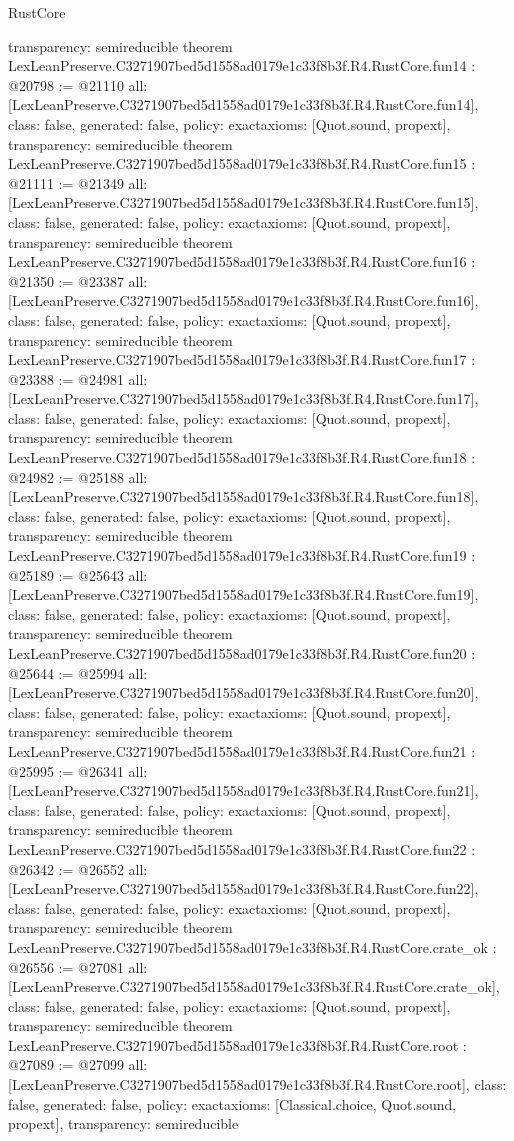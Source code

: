 \begin{lexlean}{RustCore}
\begin{coremodule}
{  transparency: semireducible
}
theorem LexLeanPreserve.C3271907bed5d1558ad0179e1c33f8b3f.R4.RustCore.fun14 : @20798 := @21110 {
  all: [LexLeanPreserve.C3271907bed5d1558ad0179e1c33f8b3f.R4.RustCore.fun14],
  class: false,
  generated: false,
  policy: exact{axioms: [Quot.sound, propext]},
  transparency: semireducible
}
theorem LexLeanPreserve.C3271907bed5d1558ad0179e1c33f8b3f.R4.RustCore.fun15 : @21111 := @21349 {
  all: [LexLeanPreserve.C3271907bed5d1558ad0179e1c33f8b3f.R4.RustCore.fun15],
  class: false,
  generated: false,
  policy: exact{axioms: [Quot.sound, propext]},
  transparency: semireducible
}
theorem LexLeanPreserve.C3271907bed5d1558ad0179e1c33f8b3f.R4.RustCore.fun16 : @21350 := @23387 {
  all: [LexLeanPreserve.C3271907bed5d1558ad0179e1c33f8b3f.R4.RustCore.fun16],
  class: false,
  generated: false,
  policy: exact{axioms: [Quot.sound, propext]},
  transparency: semireducible
}
theorem LexLeanPreserve.C3271907bed5d1558ad0179e1c33f8b3f.R4.RustCore.fun17 : @23388 := @24981 {
  all: [LexLeanPreserve.C3271907bed5d1558ad0179e1c33f8b3f.R4.RustCore.fun17],
  class: false,
  generated: false,
  policy: exact{axioms: [Quot.sound, propext]},
  transparency: semireducible
}
theorem LexLeanPreserve.C3271907bed5d1558ad0179e1c33f8b3f.R4.RustCore.fun18 : @24982 := @25188 {
  all: [LexLeanPreserve.C3271907bed5d1558ad0179e1c33f8b3f.R4.RustCore.fun18],
  class: false,
  generated: false,
  policy: exact{axioms: [Quot.sound, propext]},
  transparency: semireducible
}
theorem LexLeanPreserve.C3271907bed5d1558ad0179e1c33f8b3f.R4.RustCore.fun19 : @25189 := @25643 {
  all: [LexLeanPreserve.C3271907bed5d1558ad0179e1c33f8b3f.R4.RustCore.fun19],
  class: false,
  generated: false,
  policy: exact{axioms: [Quot.sound, propext]},
  transparency: semireducible
}
theorem LexLeanPreserve.C3271907bed5d1558ad0179e1c33f8b3f.R4.RustCore.fun20 : @25644 := @25994 {
  all: [LexLeanPreserve.C3271907bed5d1558ad0179e1c33f8b3f.R4.RustCore.fun20],
  class: false,
  generated: false,
  policy: exact{axioms: [Quot.sound, propext]},
  transparency: semireducible
}
theorem LexLeanPreserve.C3271907bed5d1558ad0179e1c33f8b3f.R4.RustCore.fun21 : @25995 := @26341 {
  all: [LexLeanPreserve.C3271907bed5d1558ad0179e1c33f8b3f.R4.RustCore.fun21],
  class: false,
  generated: false,
  policy: exact{axioms: [Quot.sound, propext]},
  transparency: semireducible
}
theorem LexLeanPreserve.C3271907bed5d1558ad0179e1c33f8b3f.R4.RustCore.fun22 : @26342 := @26552 {
  all: [LexLeanPreserve.C3271907bed5d1558ad0179e1c33f8b3f.R4.RustCore.fun22],
  class: false,
  generated: false,
  policy: exact{axioms: [Quot.sound, propext]},
  transparency: semireducible
}
theorem LexLeanPreserve.C3271907bed5d1558ad0179e1c33f8b3f.R4.RustCore.crate_ok : @26556 := @27081 {
  all: [LexLeanPreserve.C3271907bed5d1558ad0179e1c33f8b3f.R4.RustCore.crate_ok],
  class: false,
  generated: false,
  policy: exact{axioms: [Quot.sound, propext]},
  transparency: semireducible
}
theorem LexLeanPreserve.C3271907bed5d1558ad0179e1c33f8b3f.R4.RustCore.root : @27089 := @27099 {
  all: [LexLeanPreserve.C3271907bed5d1558ad0179e1c33f8b3f.R4.RustCore.root],
  class: false,
  generated: false,
  policy: exact{axioms: [Classical.choice, Quot.sound, propext]},
  transparency: semireducible
}


\end{coremodule}
\end{lexlean}
